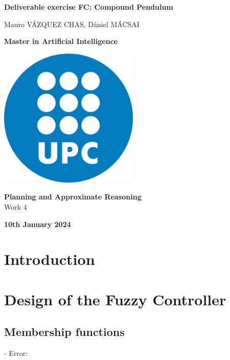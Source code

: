 \documentclass[11pt]{article}
\begin{document}
\begin{titlepage}
    \centering
    \vspace*{3cm}
    {\Huge\bfseries Deliverable exercise FC: Compound Pendulum\par}
    \vspace{1cm}
    {\large Mauro VÁZQUEZ CHAS, Dániel MÁCSAI \par}
    \vspace{4cm}
    {\large \textbf{Master in Artificial Intelligence}\par}
    \includegraphics[width=0.5\textwidth]{Logo_UPC.png}\par\vspace{1cm}
    {\large \textbf{Planning and Approximate Reasoning}\\ Work 4\par}
    \vspace{1cm}
    {\large\bfseries 10th January 2024\par}
\end{titlepage}

\pagestyle{empty}

\newpage
\tableofcontents
\newpage

\setcounter{page}{1}
\pagestyle{plain}

\section{Introduction}
\label{sec:introduction}

\section{Design of the Fuzzy Controller}
\label{sec:desig}

\subsection{Membership functions}
- Error: 
\end{document}
